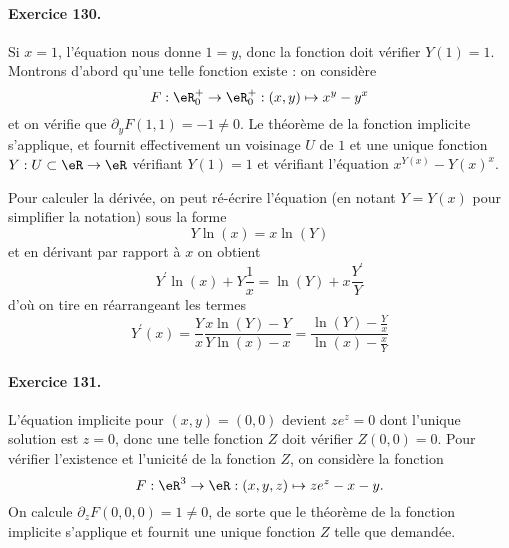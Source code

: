 \paragraph{Exercice 130.}
Si $x = 1$, l'équation nous donne $1 = y$, donc la fonction doit
vérifier $Y(1) = 1$. Montrons d'abord qu'une telle fonction existe :
on considère
\begin{equation*}
F : \eR_0^+ \to \eR_0^+ : (x,y) \mapsto x^y - y^x
\end{equation*}
et on vérifie que $\partial_y F(1,1) = - 1 \neq 0$. Le théorème de la
fonction implicite s'applique, et fournit effectivement un voisinage
$U$ de $1$ et une unique fonction $Y : U\subset \eR \to \eR$
vérifiant $Y(1) = 1$ et vérifiant l'équation $x^{Y(x)} - {Y(x)}^x$.

Pour calculer la dérivée, on peut ré-écrire l'équation (en notant $Y =
Y(x)$ pour simplifier la notation) sous la forme
\begin{equation*}
Y \ln(x) = x \ln(Y)
\end{equation*}
et en dérivant par rapport à $x$ on obtient
\begin{equation*}
Y^\prime \ln(x) + Y\frac1x = \ln(Y) + x \frac {Y^\prime} Y
\end{equation*}
d'où on tire en réarrangeant les termes
\begin{equation*}
Y^\prime(x) =   \frac Y x \frac{x \ln(Y) - Y}{Y \ln(x) - x} =
\frac{\ln(Y) - \frac Y x}{\ln(x) - \frac x Y}
\end{equation*}

\paragraph{Exercice 131.}
L'équation implicite pour $(x,y) = (0,0)$ devient $z e^z = 0$ dont
l'unique solution est $z = 0$, donc une telle fonction $Z$ doit
vérifier $Z(0,0) = 0$. Pour vérifier l'existence et l'unicité de la
fonction $Z$, on considère la fonction
\begin{equation*}
F : \eR^3 \to \eR : (x,y,z) \mapsto z e^z - x - y.
\end{equation*}
On calcule $\partial_z F(0,0,0) = 1 \neq 0$, de sorte que le théorème
de la fonction implicite s'applique et fournit une unique fonction $Z$
telle que demandée.

